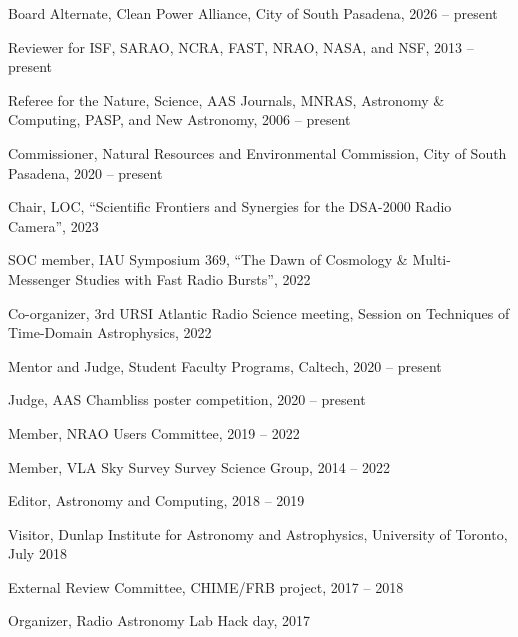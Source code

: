 \documentclass[11pt]{article}
\begin{document}
\begin{bibsection}

    \item Board Alternate, Clean Power Alliance, City of South Pasadena, 2026 -- present

    \item Reviewer for ISF, SARAO, NCRA, FAST, NRAO, NASA, and NSF, 2013 -- present

    \item Referee for the Nature, Science, AAS Journals, MNRAS, Astronomy \& Computing, PASP, and New Astronomy, 2006 -- present

    \item Commissioner, Natural Resources and Environmental Commission, City of South Pasadena, 2020 -- present

    \item Chair, LOC, ``Scientific Frontiers and Synergies for the DSA-2000 Radio Camera'', 2023

    \item SOC member, IAU Symposium 369, ``The Dawn of Cosmology \& Multi-Messenger Studies with Fast Radio Bursts'', 2022

    \item Co-organizer, 3rd URSI Atlantic Radio Science meeting, Session on Techniques of Time-Domain Astrophysics, 2022

    \item Mentor and Judge, Student Faculty Programs, Caltech, 2020 -- present

    \item Judge, AAS Chambliss poster competition, 2020 -- present

    \item Member, NRAO Users Committee, 2019 -- 2022  

    \item Member, VLA Sky Survey Survey Science Group, 2014 -- 2022

    \item Editor, Astronomy and Computing, 2018 -- 2019

    \item Visitor, Dunlap Institute for Astronomy and Astrophysics, University of Toronto, July 2018

    \item External Review Committee, CHIME/FRB project, 2017 -- 2018

    \item Organizer, Radio Astronomy Lab Hack day, 2017
    

\end{bibsection}
\end{document}
